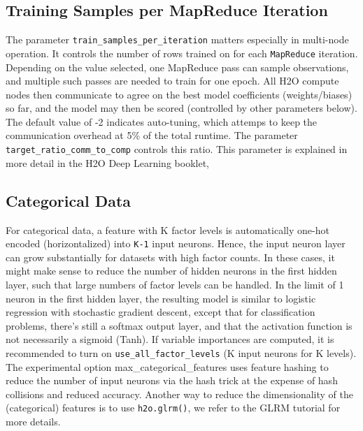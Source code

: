 \documentclass[]{book}
\begin{document}
\hypertarget{training-samples-per-mapreduce-iteration}{%
\subsection{Training Samples per MapReduce Iteration}\label{training-samples-per-mapreduce-iteration}}

The parameter \texttt{train\_samples\_per\_iteration} matters especially in multi-node operation. It controls the number of rows trained on for each \texttt{MapReduce} iteration. Depending on the value selected, one MapReduce pass can sample observations, and multiple such passes are needed to train for one epoch. All H2O compute nodes then communicate to agree on the best model coefficients (weights/biases) so far, and the model may then be scored (controlled by other parameters below). The default value of -2 indicates auto-tuning, which attemps to keep the communication overhead at 5\% of the total runtime. The parameter \texttt{target\_ratio\_comm\_to\_comp} controls this ratio. This parameter is explained in more detail in the H2O Deep Learning booklet,

\hypertarget{categorical-data}{%
\subsection{Categorical Data}\label{categorical-data}}

For categorical data, a feature with K factor levels is automatically one-hot encoded (horizontalized) into \texttt{K-1} input neurons. Hence, the input neuron layer can grow substantially for datasets with high factor counts. In these cases, it might make sense to reduce the number of hidden neurons in the first hidden layer, such that large numbers of factor levels can be handled. In the limit of 1 neuron in the first hidden layer, the resulting model is similar to logistic regression with stochastic gradient descent, except that for classification problems, there's still a softmax output layer, and that the activation function is not necessarily a sigmoid (Tanh). If variable importances are computed, it is recommended to turn on \texttt{use\_all\_factor\_levels} (K input neurons for K levels). The experimental option max\_categorical\_features uses feature hashing to reduce the number of input neurons via the hash trick at the expense of hash collisions and reduced accuracy. Another way to reduce the dimensionality of the (categorical) features is to use \texttt{h2o.glrm()}, we refer to the GLRM tutorial for more details.
\end{document}
